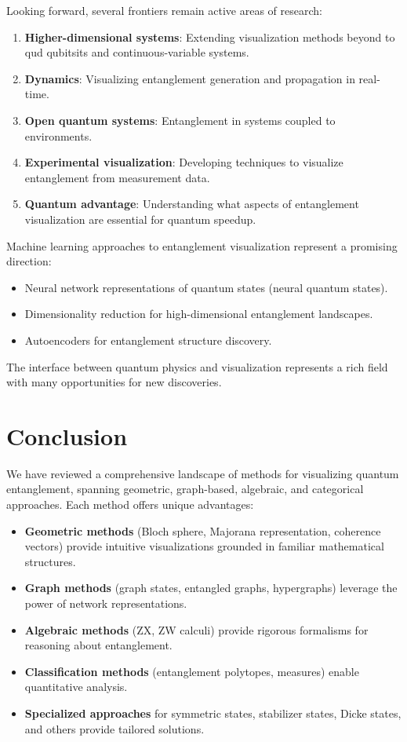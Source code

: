 \documentclass[%
 amsmath,amssymb,
 aps,
rmp,
]{revtex4-2}
\begin{document}
Looking forward, several frontiers remain active areas of research:

\begin{enumerate}
	\item \textbf{Higher-dimensional systems}: Extending visualization methods beyond to qud qubitsits and continuous-variable systems.
	\item \textbf{Dynamics}: Visualizing entanglement generation and propagation in real-time.
	\item \textbf{Open quantum systems}: Entanglement in systems coupled to environments.
	\item \textbf{Experimental visualization}: Developing techniques to visualize entanglement from measurement data.
	\item \textbf{Quantum advantage}: Understanding what aspects of entanglement visualization are essential for quantum speedup.
\end{enumerate}

Machine learning approaches to entanglement visualization represent a promising direction:
\begin{itemize}
	\item Neural network representations of quantum states (neural quantum states).
	\item Dimensionality reduction for high-dimensional entanglement landscapes.
	\item Autoencoders for entanglement structure discovery.
\end{itemize}

The interface between quantum physics and visualization represents a rich field with many opportunities for new discoveries.

\section{Conclusion}
\label{sec:conclusion}

We have reviewed a comprehensive landscape of methods for visualizing quantum entanglement, spanning geometric, graph-based, algebraic, and categorical approaches. Each method offers unique advantages:

\begin{itemize}
	\item \textbf{Geometric methods} (Bloch sphere, Majorana representation, coherence vectors) provide intuitive visualizations grounded in familiar mathematical structures.
	\item \textbf{Graph methods} (graph states, entangled graphs, hypergraphs) leverage the power of network representations.
	\item \textbf{Algebraic methods} (ZX, ZW calculi) provide rigorous formalisms for reasoning about entanglement.
	\item \textbf{Classification methods} (entanglement polytopes, measures) enable quantitative analysis.
	\item \textbf{Specialized approaches} for symmetric states, stabilizer states, Dicke states, and others provide tailored solutions.
\end{itemize}
\end{document}
